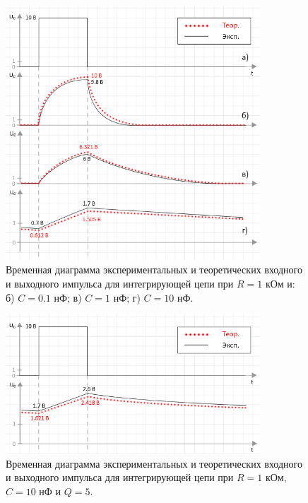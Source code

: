 \documentclass[a4paper,14pt]{extarticle}
\begin{document}
\begin{figure}[H]
\begin{center}
	\includegraphics[width=0.85\textwidth]{int_with_theory}
	\captionsetup{justification=centering}
	\caption{Временная диаграмма экспериментальных и теоретических входного и выходного импульса для интегрирующей цепи при $R = 1$ кОм и: б) $C = 0.1$ нФ; в) $C = 1$ нФ; г) $C = 10$ нФ.} 
	\label{fig:int}
\end{center}
\end{figure}

\def\belowcaptionskip{-20pt}

\begin{figure}[H]
\begin{center}
	\includegraphics[width=0.85\textwidth]{q5_with_theory}
	\captionsetup{justification=centering}
	\caption{Временная диаграмма экспериментальных и теоретических входного и выходного импульса для интегрирующей цепи при $R = 1$ кОм, $C = 10$ нФ и $Q = 5$.} 
	\label{fig:int_q5}
\end{center}
\end{figure}
\end{document}
